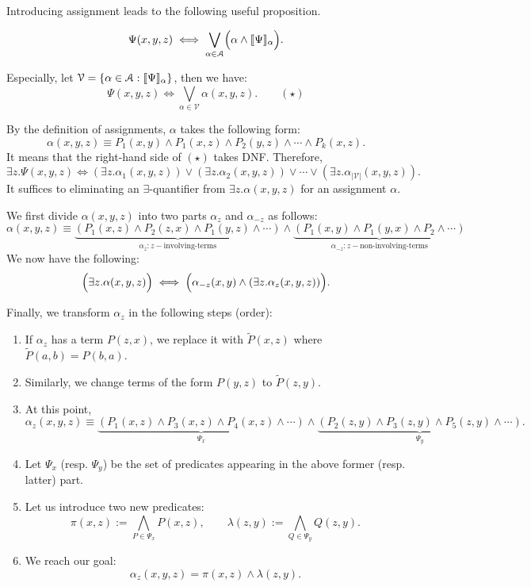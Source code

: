 \documentclass[a4paper,UKenglish,cleveref, autoref, thm-restate]{lipics-v2021}
\begin{document}
Introducing assignment leads to the following useful proposition.
\begin{proposition}
$$
\Psi(x, y, z) \iff
\bigvee_{\alpha \in \mathcal{A}} \Bigl( \alpha \land \llbracket\Psi\rrbracket_{\alpha} \Bigr).
$$

Especially, let $\mathcal{V} = \{ \alpha \in \mathcal{A} : \llbracket\Psi\rrbracket_\alpha \}$, then we have:
$$
\Psi(x,y, z) \iff \bigvee_{\alpha \in \mathcal{V}} \alpha(x, y, z). \qquad (\star)
$$
\end{proposition}


By the definition of assignments, $\alpha$ takes the following form:
$$
\alpha(x, y, z) \equiv P_1(x, y) \land P_1(x, z) \land P_2(y, z) \land \cdots \land P_k(x, z).
$$
It means that the right-hand side of $(\star)$ takes DNF. Therefore,
$$
\exists z. \Psi(x, y, z) \iff (\exists z. \alpha_1(x, y, z)) \lor (\exists z. \alpha_2(x, y, z)) \lor \cdots \lor (\exists z. \alpha_{|\mathcal{V}|}(x, y, z)).
$$
It suffices to eliminating an $\exists$-quantifier from $\exists z. \alpha(x, y, z)$ for an assignment $\alpha$.

We first divide $\alpha(x, y, z)$ into two parts $\alpha_z$ and $\alpha_{-z}$ as follows:
$$
\alpha(x, y, z) \equiv \underbrace{(P_1(x, z) \land P_2(z, x) \land P_1(y, z) \land \cdots)}_{\alpha_z : z-\text{involving-terms}} \land \underbrace{(P_1(x, y) \land P_1(y, x) \land P_2 \land \cdots)}_{\alpha_{-z} : z-\text{non-involving-terms}}
$$
We now have the following:
$$
\Bigl(\exists z. \alpha(x, y, z)\Bigr) \iff \Bigl(\alpha_{-z}(x, y) \land (\exists z. \alpha_z(x, y, z))\Bigr).
$$

Finally, we transform $\alpha_z$ in the following steps (order):
\begin{enumerate}
\item If $\alpha_z$ has a term $P(z, x)$, we replace it with $\widetilde{P}(x, z)$ where $\widetilde{P}(a, b) = P(b, a)$.
\item Similarly, we change terms of the form $P(y, z)$ to $\widetilde{P}(z, y)$.
\item At this point, 
$$
\alpha_z(x, y, z) \equiv \underbrace{(P_1(x, z) \land P_3(x, z) \land P_4(x, z) \land \cdots)}_{\Psi_x} \land \underbrace{(P_2(z, y) \land P_3(z, y) \land P_5(z, y) \land \cdots)}_{\Psi_y}.
$$
\item Let $\Psi_x$ (resp. $\Psi_y$) be the set of predicates appearing in the above former (resp. latter) part.
\item Let us introduce two new predicates:
$$
\pi(x, z) := \bigwedge_{P \in \Psi_x} P(x, z), \qquad
\lambda(z, y) := \bigwedge_{Q \in \Psi_y} Q(z, y).
$$
\item We reach our goal:
$$
\alpha_z(x, y, z) = \pi(x, z) \land \lambda(z, y).
$$
\end{enumerate}
\end{document}
